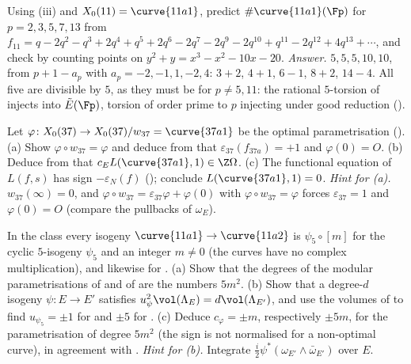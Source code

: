 \begin{exercise}\label{ex:moddeg:ex-counts}
Using (iii) and $X_0(11)=\curve{11a1}$, predict $\#\curve{11a1}(\Fp)$ for $p=2,3,5,7,13$ from $f_{11}=q-2q^2-q^3+2q^4+q^5+2q^6-2q^7-2q^9-2q^{10}+q^{11}-2q^{12}+4q^{13}+\cdots$, and
check by counting points on $y^2+y=x^3-x^2-10x-20$. \emph{Answer.} $5,5,5,10,10$, from $p+1-a_p$ with $a_p=-2,-1,1,-2,4$: $3+2$, $4+1$, $6-1$, $8+2$, $14-4$.
All five are divisible by $5$, as they must be for $p\ne5,11$: the rational $5$-torsion of  injects into $\tilde E(\Fp)$, torsion of order prime to $p$ injecting under
good reduction ().
\end{exercise}

\begin{exercise}\label{ex:moddeg:ex-37-lvalue}
Let $\varphi\colon X_0(37)\to X_0(37)/w_{37}=\curve{37a1}$ be the optimal parametrisation (). (a) Show $\varphi\circ w_{37}=\varphi$ and deduce from  that
$\varepsilon_{37}(f_{37a})=+1$ and $\varphi(0)=O$. (b) Deduce from  that $c_EL(\curve{37a1},1)\in\Z\Omega$. (c) The functional equation of $L(f,s)$ has sign $-\varepsilon_N(f)$
(); conclude $L(\curve{37a1},1)=0$. \emph{Hint for (a).} $w_{37}(\infty)=0$, and $\varphi\circ w_{37}=\varepsilon_{37}\varphi+\varphi(0)$ with $\varphi\circ w_{37}=\varphi$ forces $\varepsilon_{37}=1$ and
$\varphi(0)=O$ (compare the pullbacks of $\omega_E$).
\end{exercise}

\begin{exercise}\label{ex:moddeg:ex-11a-degrees}
In the class  every isogeny $\curve{11a1}\to\curve{11a2}$ is $\psi_5\circ[m]$ for the cyclic $5$-isogeny $\psi_5$ and an integer $m\ne0$ (the curves have no complex multiplication), and likewise for
. (a) Show that the degrees of the modular parametrisations of  and of  are the numbers $5m^2$. (b) Show that a degree-$d$ isogeny $\psi\colon E\to E'$ satisfies
$u_\psi^2\vol(\Lambda_E)=d\vol(\Lambda_{E'})$, and use the volumes of  to find $u_{\psi_5}=\pm1$ for  and $\pm5$ for . (c) Deduce $c_\varphi=\pm m$, respectively $\pm5m$,
for the parametrisation of degree $5m^2$ (the sign is not normalised for a non-optimal curve), in agreement with . \emph{Hint for (b).} Integrate $\frac i2\psi^*(\omega_{E'}\wedge\bar\omega_{E'})$ over $E$.
\end{exercise}

